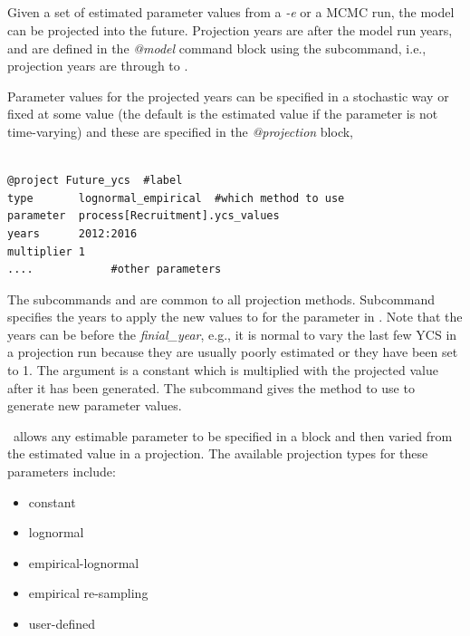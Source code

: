 \subsection{}\label{sec:projection}

Given a set of estimated parameter values from a \textit{-e} or a MCMC run, 
the model can be projected into the future. Projection years are after the model run years, and are defined in the \textit{@model} command block using the  subcommand, i.e., projection years are  through to .

Parameter values for the projected years can be specified in a stochastic way or fixed at some value (the default is the estimated value if the parameter is not time-varying) and these are specified in the \textit{@projection} block,

{\small{\begin{verbatim}

@project Future_ycs  #label
type       lognormal_empirical  #which method to use
parameter  process[Recruitment].ycs_values
years      2012:2016
multiplier 1
....            #other parameters
\end{verbatim}}}

The subcommands  and  are common to all projection methods. Subcommand  specifies the years to apply the new values to for the parameter in . Note that the years can be before the \textit{finial\_year}, e.g., it is normal to vary the last few YCS in a projection run because they are usually poorly estimated or they have been set to 1.  The argument  is a constant which is multiplied with the projected value after it has been generated. The  subcommand gives the method to use to generate new parameter values.

\CNAME~allows any estimable parameter to be specified in a  block and then varied from the estimated value in a projection. The available projection types for these parameters include:

\begin{itemize}
	\item constant
	\item lognormal
	\item empirical-lognormal
	\item empirical re-sampling
	\item user-defined
\end{itemize}

